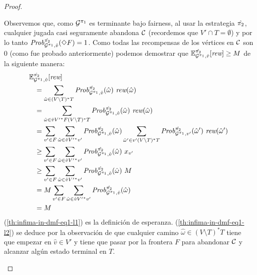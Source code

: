 \begin{proof}
\begin{proofofclaim}
    Observemos que, como $\mathcal{G}^{\pi_{1}}$ es terminante bajo fairness,
    al usar la estrategia $\hat{\pi_{2}}$, cualquier jugada casi seguramente abandona $\mathcal{C}$ (recordemos que $V' \cap T = \emptyset$) y por lo tanto
    $\mathit{Prob}^{\hat{\pi_{2}}}_{\mathcal{G}^{\pi_{1}},\hat{v}} (\Diamond F) = 1$.
    Como todas las recompensas de los vértices en $\mathcal{C}$ son $0$ (como fue probado anteriormente) podemos demostrar que
    $\mathbb{E}^{\hat{\pi_{2}}}_{\mathcal{G}^{\pi_{1}},\hat{v}}[\textit{rew}]
    \geq M$ de la siguiente manera:
    \begin{align}	
      \ExpectMDP{\hat{\strat{2}}}_{\StochG^{\strat{1}},\hat{v}}[\Rewards] \hspace{-4em} & \notag\\
      \label{th:infima-in-dmf-eq1-l1}
      &= \sum_{\hat{\omega} \in (V \setminus T)^*T} \MDPProb{\hat{\strat{2}}}_{\StochG^{\strat{1}},\hat{v}}(\hat{\omega})\ \Rewards(\hat{\omega}) \\
      \label{th:infima-in-dmf-eq1-l2}
      &=\sum_{\hat{\omega} \in \hat{v}{V'}^*F(V \setminus T)^*T} \MDPProb{\hat{\strat{2}}}_{\StochG^{\strat{1}},\hat{v}}(\hat{\omega})\ \Rewards(\hat{\omega}) \\
      \label{th:infima-in-dmf-l3}
      &= \sum_{v' \in F} \sum_{\hat{\omega} \in \hat{v}{V'}^*v'} \MDPProb{\hat{\strat{2}}}_{\StochG^{\strat{1}},\hat{v}}(\hat{\omega}) \sum_{\hat{\omega}' \in v' (V \setminus T)^*T}  \MDPProb{\hat{\strat{2}}}_{\StochG^{\strat{1}},v'}(\hat{\omega}')\ \Rewards(\hat{\omega}')\\
      \label{th:infima-in-dmf-l4}
      &\geq \sum_{v' \in F} \sum_{\hat{\omega} \in \hat{v}{V'}^*v'} \MDPProb{\hat{\strat{2}}}_{\StochG^{\strat{1}},\hat{v}}(\hat{\omega})\ x_{v'} \\
      \label{th:infima-in-dmf-l5}
      &\geq \sum_{v' \in F} \sum_{\hat{\omega} \in \hat{v}{V'}^*v'} \MDPProb{\hat{\strat{2}}}_{\StochG^{\strat{1}},\hat{v}}(\hat{\omega})\ M \\
      \label{th:infima-in-dmf-l6}
      &= M  \sum_{v' \in F} \sum_{\hat{\omega} \in \hat{v}{V'}^*v'} \MDPProb{\hat{\strat{2}}}_{\StochG^{\strat{1}},\hat{v}}(\hat{\omega}) \\
      \label{th:infima-in-dmf-l7}
      &= M
    \end{align}
    (\ref{th:infima-in-dmf-eq1-l1}) es la definición de esperanza.
    (\ref{th:infima-in-dmf-eq1-l2}) se deduce por la observación de que cualquier camino $\hat{\omega} \in (V \setminus T)^*T$ tiene que empezar en
    $\hat{v}\in V'$ y tiene que pasar por la frontera $F$ para abandonar $\mathcal{C}$ y alcanzar algún estado terminal en $T$.

\end{proofofclaim}
\end{proof}
